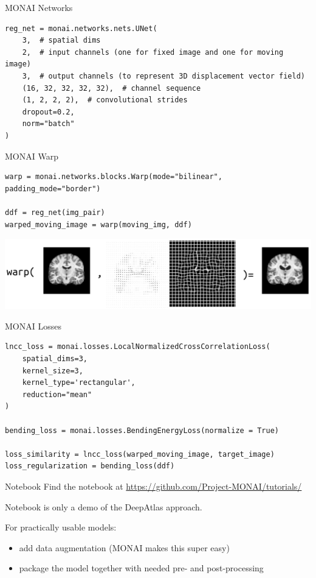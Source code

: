 \documentclass[10pt,aspectratio=169,dvipsnames]{beamer}
\begin{document}
\begin{frame}[fragile]{MONAI Networks}
\begin{verbatim}
reg_net = monai.networks.nets.UNet(
	3,  # spatial dims
	2,  # input channels (one for fixed image and one for moving image)
	3,  # output channels (to represent 3D displacement vector field)
	(16, 32, 32, 32, 32),  # channel sequence
	(1, 2, 2, 2),  # convolutional strides
	dropout=0.2,
	norm="batch"
)
\end{verbatim}
\end{frame}

\begin{frame}[fragile]{MONAI Warp}
	\begin{verbatim}
warp = monai.networks.blocks.Warp(mode="bilinear", padding_mode="border")

ddf = reg_net(img_pair)
warped_moving_image = warp(moving_img, ddf)
	\end{verbatim}
\pause
\begin{center}
	\includegraphics[scale=0.4]{ddf.png}
\end{center}
\end{frame}


\begin{frame}[fragile]{MONAI Losses}
\begin{verbatim}
lncc_loss = monai.losses.LocalNormalizedCrossCorrelationLoss(
	spatial_dims=3,
	kernel_size=3,
	kernel_type='rectangular',
	reduction="mean"
)

bending_loss = monai.losses.BendingEnergyLoss(normalize = True)

loss_similarity = lncc_loss(warped_moving_image, target_image)
loss_regularization = bending_loss(ddf)
\end{verbatim}
\end{frame}



\begin{frame}{Notebook}
Find the notebook at
\url{https://github.com/Project-MONAI/tutorials/}

\vspace{2em}
	
Notebook is only a demo of the DeepAtlas approach.

For practically usable models:
\begin{itemize}
	\item add data augmentation (MONAI makes this super easy)
	\item package the model together with needed pre- and post-processing
\end{itemize}
\end{frame}
\end{document}
